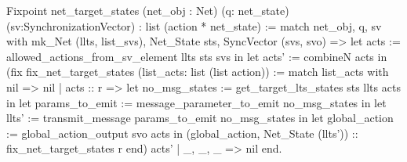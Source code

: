 Fixpoint net_target_states (net_obj : Net) (q: net_state) 
            (sv:SynchronizationVector) : list (action * net_state) :=
 match net_obj, q, sv with
  mk_Net (llts, list_svs), Net_State sts, SyncVector (svs, svo) =>
   let acts := allowed_actions_from_sv_element llts sts svs in       
   let acts' := combineN acts in      
   (fix fix_net_target_states (list_acts: list (list action)) :=
    match list_acts with
      nil       => nil
    | acts :: r => 
     let no_msg_states := get_target_lts_states sts llts acts in
     let params_to_emit := message_parameter_to_emit no_msg_states in
     let llts' := transmit_message params_to_emit no_msg_states in
     let global_action := global_action_output svo acts in
     (global_action, Net_State (llts')) :: fix_net_target_states r
     end) acts'
  | _, _, _ => nil
  end.